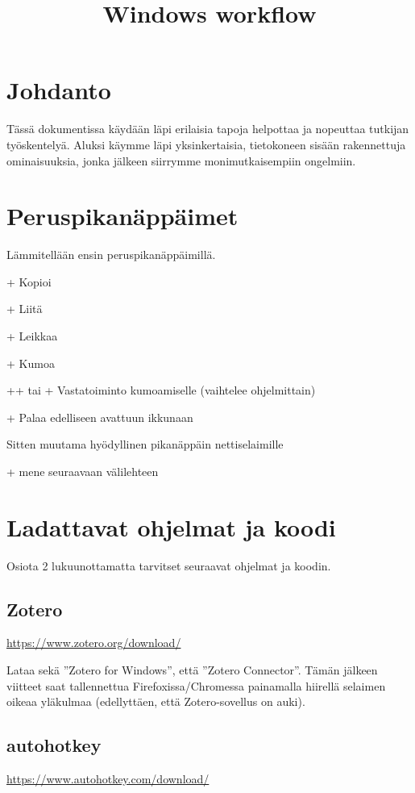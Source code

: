 \documentclass[a5paper,9pt]{scrartcl}
\title{Windows workflow}
\begin{document}
 
    \section{Johdanto}
    Tässä dokumentissa käydään läpi erilaisia tapoja helpottaa ja nopeuttaa tutkijan työskentelyä. Aluksi käymme läpi yksinkertaisia, tietokoneen sisään rakennettuja ominaisuuksia, jonka jälkeen siirrymme monimutkaisempiin ongelmiin.
    
    \section{Peruspikanäppäimet}
    Lämmitellään ensin peruspikanäppäimillä.
    
    
    + Kopioi 
    
    + Liitä 
    
    + Leikkaa 
    
    + Kumoa
    
    ++ tai + Vastatoiminto kumoamiselle (vaihtelee ohjelmittain)
    
    + Palaa edelliseen avattuun ikkunaan
    
    Sitten muutama hyödyllinen pikanäppäin nettiselaimille
    
    + mene seuraavaan välilehteen
    
    \section{Ladattavat ohjelmat ja koodi}
    Osiota 2 lukuunottamatta tarvitset seuraavat ohjelmat ja koodin.
    
    \subsection{Zotero}
    \url{https://www.zotero.org/download/}
    
    
    Lataa sekä ''Zotero for Windows'', että ''Zotero Connector''. Tämän jälkeen viitteet saat tallennettua Firefoxissa/Chromessa painamalla hiirellä selaimen oikeaa yläkulmaa (edellyttäen, että Zotero-sovellus on auki).
    
    \subsection{autohotkey}
    \url{https://www.autohotkey.com/download/}
    
\end{document}
